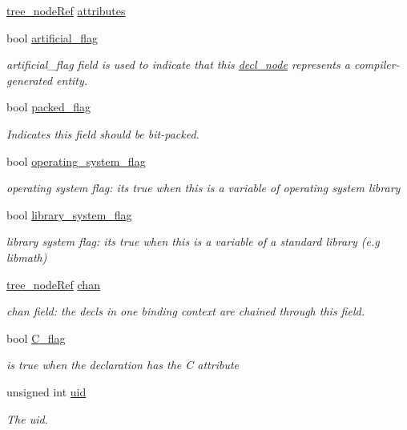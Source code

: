 \begin{DoxyCompactItemize}
\hyperlink{tree__node_8hpp_a6ee377554d1c4871ad66a337eaa67fd5}{tree\+\_\+node\+Ref} \hyperlink{structdecl__node_a2042ff2aba0abb5b7c6c38e2490d8c1d}{attributes}
\item 
bool \hyperlink{structdecl__node_a99bf581d9245483b7fa402072094835b}{artificial\+\_\+flag}
\begin{DoxyCompactList}\small\item\em artificial\+\_\+flag field is used to indicate that this \hyperlink{structdecl__node}{decl\+\_\+node} represents a compiler-\/generated entity. \end{DoxyCompactList}\item 
bool \hyperlink{structdecl__node_aae0dddaa904bf9367a4d045df78d7a3e}{packed\+\_\+flag}
\begin{DoxyCompactList}\small\item\em Indicates this field should be bit-\/packed. \end{DoxyCompactList}\item 
bool \hyperlink{structdecl__node_a93a4d05434b7bdb6074264ccafd622ce}{operating\+\_\+system\+\_\+flag}
\begin{DoxyCompactList}\small\item\em operating system flag\+: it\textquotesingle{}s true when this is a variable of operating system library \end{DoxyCompactList}\item 
bool \hyperlink{structdecl__node_a64f029e5a78c2a08b2739ede17c9c411}{library\+\_\+system\+\_\+flag}
\begin{DoxyCompactList}\small\item\em library system flag\+: it\textquotesingle{}s true when this is a variable of a standard library (e.\+g libmath) \end{DoxyCompactList}\item 
\hyperlink{tree__node_8hpp_a6ee377554d1c4871ad66a337eaa67fd5}{tree\+\_\+node\+Ref} \hyperlink{structdecl__node_a0182832cf7a99a9ad11386a0fd499e7a}{chan}
\begin{DoxyCompactList}\small\item\em chan field\+: the decls in one binding context are chained through this field. \end{DoxyCompactList}\item 
bool \hyperlink{structdecl__node_a211b05cc143eac8340ae3509c2519243}{C\+\_\+flag}
\begin{DoxyCompactList}\small\item\em is true when the declaration has the C attribute \end{DoxyCompactList}\item 
unsigned int \hyperlink{structdecl__node_aaefaebdb0a81bf16733e9f88089bc318}{uid}
\begin{DoxyCompactList}\small\item\em The uid. \end{DoxyCompactList}\end{DoxyCompactItemize}
